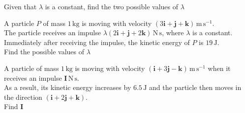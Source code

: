 \documentclass[leqno]{article}
\begin{document}
\begin{enumerate}[
  label=\textbf{\arabic*.},
  leftmargin=*,
  topsep=0pt,
  partopsep=0pt,
  parsep=0pt
]
Given that $\lambda$ is a constant, find the two possible values of $\lambda$ 

\newpage

\questionitem

A particle $P$ of mass $1\,\mathrm{kg}$ is moving with velocity $(3\mathbf{i}+\mathbf{j}+\mathbf{k})\,\mathrm{m\,s^{-1}}$. \\

The particle receives an impulse $\lambda(2\mathbf{i}+\mathbf{j}+2\mathbf{k})\,\mathrm{N\,s}$, where $\lambda$ is a constant. \\

Immediately after receiving the impulse, the kinetic energy of $P$ is $19\,\mathrm{J}$. \\

Find the possible values of $\lambda$ 

\newpage

\questionitem

A particle of mass $1\,\mathrm{kg}$ is moving with velocity $(\mathbf{i}+3\mathbf{j}-\mathbf{k})\,\mathrm{m\,s^{-1}}$ when it receives an impulse $\mathbf{I}\,\mathrm{N\,s}$. \\

As a result, its kinetic energy increases by $6.5\,\mathrm{J}$ and the particle then moves in the direction $(\mathbf{i}+2\mathbf{j}+\mathbf{k})$. \\

Find $\mathbf{I}$ 
\end{enumerate}
\end{document}
